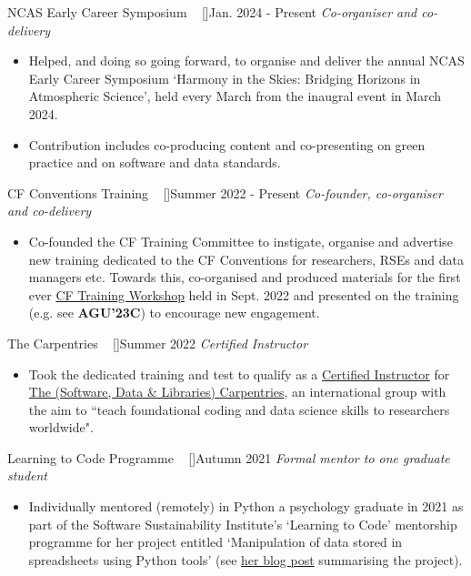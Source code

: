 \begin{projects}
     
\projecta
	{NCAS Early Career Symposium ~ [\href{https://sites.google.com/ncas.ac.uk/ncasharmonyintheskies/home}{\small{\websiteSymbol}}]}{Jan. 2024 - Present}
	{
	    \textit{Co-organiser and co-delivery}
	}
	{\begin{itemize}
     \item Helped, and doing so going forward, to organise and deliver the annual NCAS Early Career Symposium `Harmony in the Skies: Bridging Horizons in Atmospheric Science', held every March from the inaugral event in March 2024.
     \item Contribution includes co-producing content and co-presenting on green practice and on software and data standards.
     \end{itemize}}

\projecta
	{CF Conventions Training ~ [\href{https://cfconventions.org/Training/}{\small{\websiteSymbol}}]}{Summer 2022 - Present}
	{
	    \textit{Co-founder, co-organiser and co-delivery} ~ 
	}
	{\begin{itemize}
     \item Co-founded the CF Training Committee to instigate, organise and advertise new training dedicated to the CF Conventions for researchers, RSEs and data managers etc. Towards this, co-organised and produced materials for the first ever \href{https://cfconventions.org/Training/2022-Training-Workshop.html}{CF Training Workshop} held in Sept. 2022 and presented on the training (e.g. see \textbf{AGU’23C}) to encourage new engagement.
     \end{itemize}}

\projecta
	{The Carpentries ~ [\href{https://github.com/sadielbartholomew/sadielbartholomew/blob/master/assets/carpentries_instructor_certificate.pdf}{\small{\faCertificate}}]}{Summer 2022}
	{
	    \textit{Certified Instructor}
	}
	{\begin{itemize}
     \item Took the dedicated training and test to qualify as a \href{https://carpentries.org/instructors/}{Certified Instructor} for \href{}{The (Software, Data \& Libraries) Carpentries}, an international group with the aim to ``teach foundational coding and data science skills to researchers worldwide".
     \end{itemize}
     }

\projecta
	{Learning to Code Programme ~ [\href{https://www.software.ac.uk/mentorship-programme/mentorship-programme-2021}{\small{\websiteSymbol}}]}{Autumn 2021}
	{
	    \textit{Formal mentor to one graduate student}
	}
	{\begin{itemize}
     \item Individually mentored (remotely) in Python a psychology graduate in 2021 as part of the Software Sustainability Institute's `Learning to Code' mentorship programme for her project entitled `Manipulation of data stored in spreadsheets using Python tools' (see \href{https://www.software.ac.uk/blog/learning-code-my-experience-psychology-graduate}{her blog post} summarising the project).
     \end{itemize}}


\end{projects}
